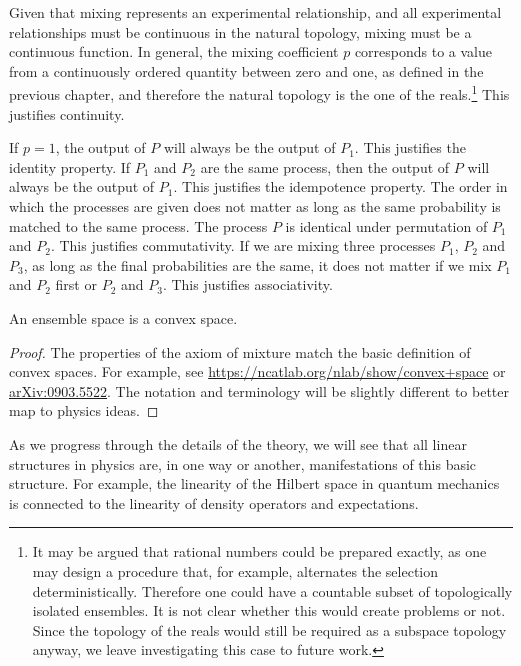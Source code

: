 \begin{mathSection}
\begin{justification}
	Given that mixing represents an experimental relationship, and all experimental relationships must be continuous in the natural topology, mixing must be a continuous function. In general, the mixing coefficient $p$ corresponds to a value from a continuously ordered quantity between zero and one, as defined in the previous chapter, and therefore the natural topology is the one of the reals.\footnote{It may be argued that rational numbers could be prepared exactly, as one may design a procedure that, for example, alternates the selection deterministically. Therefore one could have a countable subset of topologically isolated ensembles. It is not clear whether this would create problems or not. Since the topology of the reals would still be required as a subspace topology anyway, we leave investigating this case to future work.} This justifies continuity.

	If $p=1$, the output of $P$ will always be the output of $P_1$. This justifies the identity property. If $P_1$ and $P_2$ are the same process, then the output of $P$ will always be the output of $P_1$. This justifies the idempotence property. The order in which the processes are given does not matter as long as the same probability is matched to the same process. The process $P$ is identical under permutation of $P_1$ and $P_2$. This justifies commutativity. If we are mixing three processes $P_1$, $P_2$ and $P_3$, as long as the final probabilities are the same, it does not matter if we mix $P_1$ and $P_2$ first or $P_2$ and $P_3$. This justifies associativity.
\end{justification}

\begin{coro}
	An ensemble space is a convex space.
\end{coro}

\begin{proof}
	The properties of the axiom of mixture match the basic definition of convex spaces. For example, see  \href{https://ncatlab.org/nlab/show/convex+space}{https://ncatlab.org/nlab/show/convex+space} or \href{https://arxiv.org/abs/0903.5522}{arXiv:0903.5522}.  The notation and terminology will be slightly different to better map to physics ideas. 
\end{proof}

\end{mathSection}

As we progress through the details of the theory, we will see that all linear structures in physics are, in one way or another, manifestations of this basic structure. For example, the linearity of the Hilbert space in quantum mechanics is connected to the linearity of density operators and expectations. 

